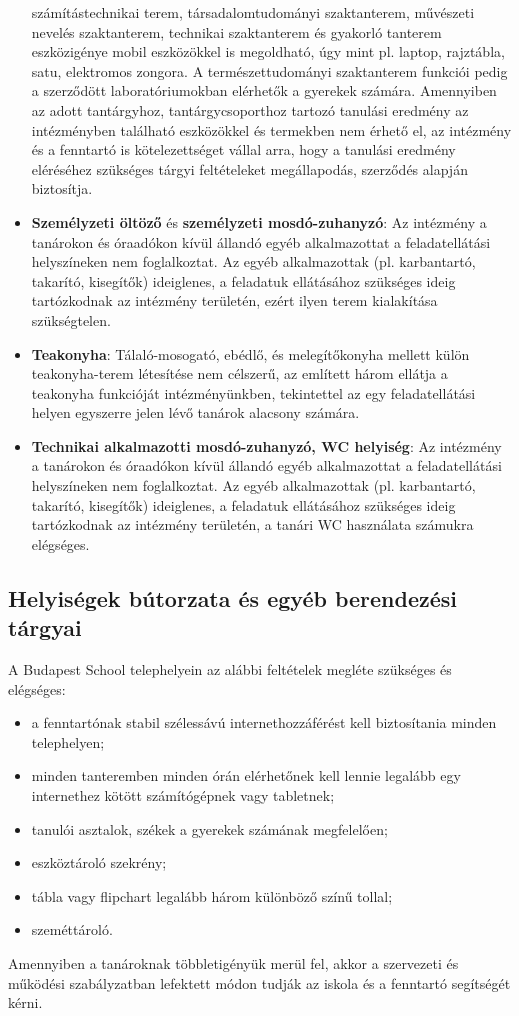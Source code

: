 \begin{itemize}
  számítástechnikai terem, társadalomtudományi szaktanterem, művészeti
  nevelés szaktanterem, technikai szaktanterem és gyakorló tanterem
  eszközigénye mobil eszközökkel is megoldható, úgy mint pl. laptop,
  rajztábla, satu, elektromos zongora. A természettudományi szaktanterem
  funkciói pedig a szerződött laboratóriumokban elérhetők a gyerekek
  számára. Amennyiben az adott tantárgyhoz, tantárgycsoporthoz tartozó
  tanulási eredmény az intézményben található eszközökkel és termekben
  nem érhető el, az intézmény és a fenntartó is kötelezettséget vállal
  arra, hogy a tanulási eredmény eléréséhez szükséges tárgyi
  feltételeket megállapodás, szerződés alapján biztosítja.
\item
  \textbf{Személyzeti öltöző} és \textbf{személyzeti mosdó-zuhanyzó}: Az
  intézmény a tanárokon és óraadókon kívül állandó egyéb alkalmazottat
  a feladatellátási helyszíneken nem foglalkoztat. Az egyéb
  alkalmazottak (pl. karbantartó, takarító, kisegítők) ideiglenes, a
  feladatuk ellátásához szükséges ideig tartózkodnak az intézmény
  területén, ezért ilyen terem kialakítása szükségtelen.
\item
  \textbf{Teakonyha}: Tálaló-mosogató, ebédlő, és melegítőkonyha mellett\break
  külön teakonyha-terem létesítése nem célszerű, az említett három
  ellátja a teakonyha funkcióját intézményünkben, tekintettel az egy
  feladatellátási helyen egyszerre jelen lévő tanárok alacsony számára.
\item
  \textbf{Technikai alkalmazotti mosdó-zuhanyzó, WC helyiség}: Az
  intézmény a tanárokon és óraadókon kívül állandó egyéb alkalmazottat
  a feladatellátási helyszíneken nem foglalkoztat. Az egyéb
  alkalmazottak (pl. karbantartó, takarító, kisegítők) ideiglenes, a
  feladatuk ellátásához szükséges ideig tartózkodnak az intézmény
  területén, a tanári WC használata számukra elégséges.
\end{itemize}

\hypertarget{helyisegek-butorzata-es-egyeb-berendezesi-targyai}{%
\subsection{Helyiségek bútorzata és egyéb berendezési
tárgyai}\label{helyisegek-butorzata-es-egyeb-berendezesi-targyai}}

A Budapest School telephelyein az alábbi feltételek megléte szükséges és
elégséges:

\begin{itemize}
\tightlist
\item
  a fenntartónak stabil szélessávú internethozzáférést kell biztosítania
  minden telephelyen;
\item
  minden tanteremben minden órán elérhetőnek kell lennie legalább egy
  internethez kötött számítógépnek vagy tabletnek;
\item
  tanulói asztalok, székek a gyerekek számának megfelelően;
\item
  eszköztároló szekrény;
\item
  tábla vagy flipchart legalább három különböző színű tollal;
\item
  szeméttároló.
\end{itemize}

Amennyiben a tanároknak többletigényük merül fel, akkor a szervezeti és
működési szabályzatban lefektett módon tudják az iskola és a fenntartó
segítségét kérni.
